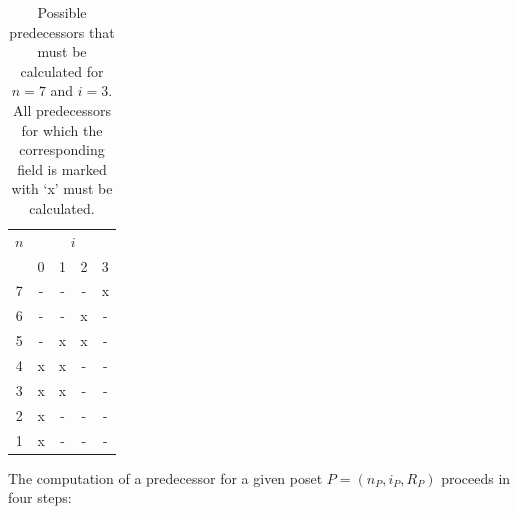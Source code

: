 \documentclass[10pt,journal,compsoc]{IEEEtran}
\begin{document}
\begin{table}[!t]
  \renewcommand{\arraystretch}{1.2}
  \caption{Possible predecessors that must be calculated for $n = 7$ and $i = 3$. All predecessors for which the corresponding field is marked with `x' must be calculated.}
  \label{table:n_i_values_calculated}
  \centering
  \begin{tabular}{c|cccc}
    $n$ & \multicolumn{4}{c}{$i$}             \\
        & 0                       & 1 & 2 & 3 \\ \hline
    7   & -                       & - & - & x \\
    6   & -                       & - & x & - \\
    5   & -                       & x & x & - \\
    4   & x                       & x & - & - \\
    3   & x                       & x & - & - \\
    2   & x                       & - & - & - \\
    1   & x                       & - & - & - \\
  \end{tabular}%
\end{table}

The computation of a predecessor for a given poset $P = (n_P, i_P, R_P)$ proceeds in four steps:
\end{document}
